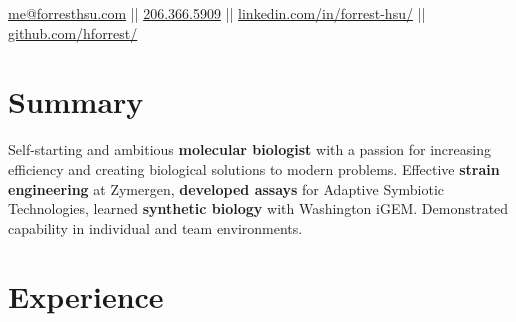 \documentclass[]{forrest-resume-interfont}
\begin{document}
%
%

\lastupdated

%
%


%
%

{
	\href{mailto:me@forresthsu.com}{me@forresthsu.com} || 
	\href{tel:2063665909}{206.366.5909} || 
	\href{https://www.linkedin.com/in/forrest-hsu/}{linkedin.com/in/forrest-hsu/} ||
	\href{https://github.com/HForrest/}{github.com/hforrest/}
}

%
%
\spacesep
\section{ Summary}
\raggedright 

Self-starting and ambitious \textbf{molecular biologist} with a passion for increasing efficiency and  creating biological solutions to modern problems. Effective \textbf{strain engineering} at Zymergen, \textbf{developed assays} for Adaptive Symbiotic Technologies, learned \textbf{synthetic biology} with Washington iGEM. Demonstrated capability in individual and team environments.
 
\linesep



\section{ Experience}
\\
\end{document}
